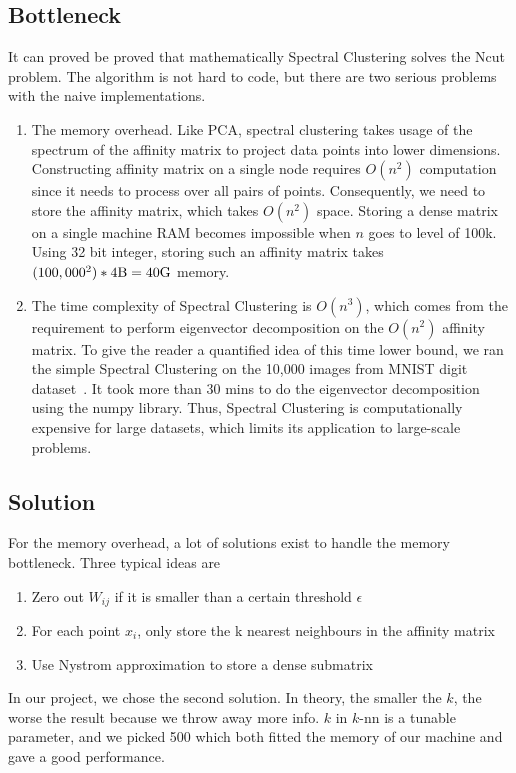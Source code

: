 \documentclass{acm_proc_article-sp}
\begin{document}
\subsection{Bottleneck}
It can proved be proved that mathematically Spectral Clustering solves the Ncut problem. The algorithm is not hard to code, but there are two serious problems with the naive implementations.
\begin{enumerate}
\item{The memory overhead. Like PCA, spectral clustering takes usage of the spectrum of the affinity matrix to project data points into lower dimensions. Constructing affinity matrix on a single node requires $O(n^2)$ computation since it needs to process over all pairs of points. Consequently, we need to store the affinity matrix, which takes $O(n^2)$ space. Storing a dense matrix on a single machine RAM becomes impossible when $n$ goes to level of 100k. Using 32 bit integer, storing such an affinity matrix takes $(100,000^2) * 4 \textnormal{B} = 40 \textnormal{G}$ memory.
}
\item{The time complexity of Spectral Clustering is $O(n^3)$, which comes from the requirement to perform eigenvector decomposition on the $O(n^2)$ affinity matrix. To give the reader a quantified idea of this time lower bound, we ran the simple Spectral Clustering on the 10,000 images from MNIST digit dataset~\cite{Lichman:2013}. It took more than 30 mins to do the eigenvector decomposition using the numpy library. Thus, Spectral Clustering is computationally expensive for large datasets, which limits its application to large-scale problems.}
\end{enumerate}

\subsection{Solution}
For the memory overhead, a lot of solutions exist to handle the memory bottleneck. Three typical ideas are
\begin{enumerate}
\item{Zero out $W_{ij}$ if it is smaller than a certain threshold $\epsilon$}
\item{For each point $x_i$, only store the k nearest neighbours in the affinity matrix}
\item{Use Nystrom approximation to store a dense submatrix~\cite{fowlkes2004spectral}}
\end{enumerate}
In our project, we chose the second solution. In theory, the smaller the $k$, the worse the result because we throw away more info. $k$ in $k$-nn is a tunable parameter, and we picked 500 which both fitted the memory of our machine and gave a good performance. 
\end{document}
